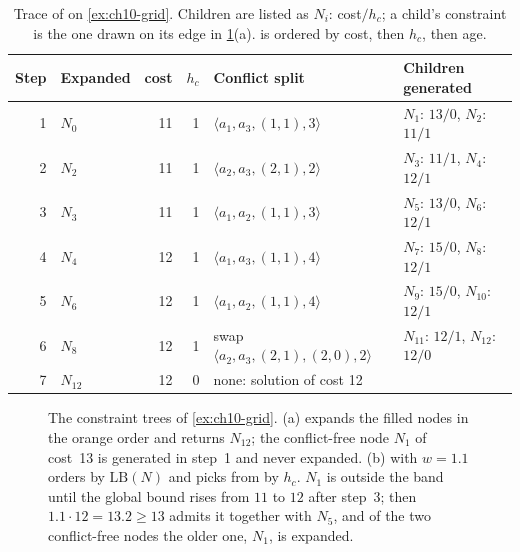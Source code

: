 \begin{table}[tb]
  \centering\small
  \caption{Trace of \cbs on \cref{ex:ch10-grid}. Children are listed as
  $N_i$: cost$/h_c$; a child's constraint is the one drawn on its edge in
  \cref{fig:ch10-example-trees}(a). \Open is ordered by cost, then $h_c$, then
  age.}
  \label{tab:ch10-cbs-trace}
  \begin{tabular}{@{}rlrrll@{}}
  \toprule
  Step & Expanded & cost & $h_c$ & Conflict split & Children generated\\
  \midrule
  1 & $N_0$ & 11 & 1 & $\langle a_1, a_3, (1,1), 3\rangle$ & $N_1$: $13/0$, $N_2$: $11/1$\\
  2 & $N_2$ & 11 & 1 & $\langle a_2, a_3, (2,1), 2\rangle$ & $N_3$: $11/1$, $N_4$: $12/1$\\
  3 & $N_3$ & 11 & 1 & $\langle a_1, a_2, (1,1), 3\rangle$ & $N_5$: $13/0$, $N_6$: $12/1$\\
  4 & $N_4$ & 12 & 1 & $\langle a_1, a_3, (1,1), 4\rangle$ & $N_7$: $15/0$, $N_8$: $12/1$\\
  5 & $N_6$ & 12 & 1 & $\langle a_1, a_2, (1,1), 4\rangle$ & $N_9$: $15/0$, $N_{10}$: $12/1$\\
  6 & $N_8$ & 12 & 1 & swap $\langle a_2, a_3, (2,1), (2,0), 2\rangle$ & $N_{11}$: $12/1$, $N_{12}$: $12/0$\\
  7 & $N_{12}$ & 12 & 0 & none: solution of cost 12 & \\
  \bottomrule
  \end{tabular}
\end{table}

\begin{figure}[tb]
  \centering
  \caption{The constraint trees of \cref{ex:ch10-grid}. (a) \cbs expands
  the filled nodes in the orange order and returns $N_{12}$; the
  conflict-free node $N_1$ of cost~13 is generated in step~1 and never
  expanded. (b) \ecbs with $w = 1.1$ orders \Open by $\mathrm{LB}(N)$ and
  picks from \Focal by $h_c$. $N_1$ is outside the band until the global
  bound rises from $11$ to $12$ after step~3; then $1.1 \cdot 12 = 13.2 \ge
  13$ admits it together with $N_5$, and of the two conflict-free nodes the
  older one, $N_1$, is expanded.}
  \label{fig:ch10-example-trees}
\end{figure}

